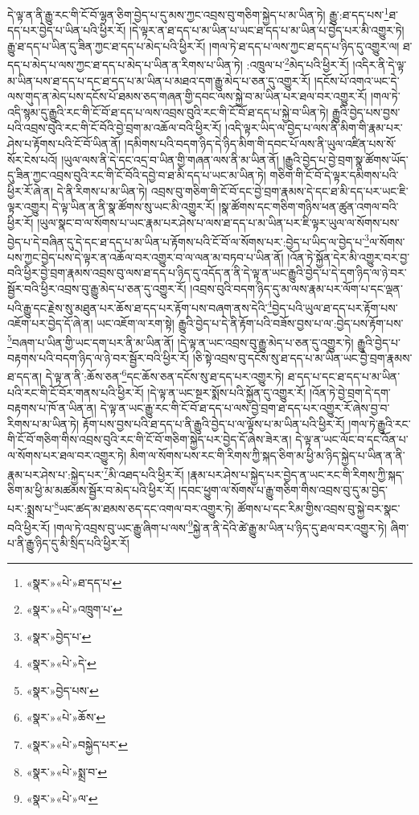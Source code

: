 དེ་ལྟ་ན་ནི་རྒྱུ་རང་གི་ངོ་བོ་ལྷན་ཅིག་བྱེད་པ་དུ་མས་ཀྱང་འབྲས་བུ་གཅིག་སྐྱེད་པ་མ་ཡིན་ཏེ། རྒྱུ་:ཐ་དད་པས་\footnote{«སྣར་»«པེ་»ཐ་དད་པ་}ཐ་དད་པར་བྱེད་པ་ཡིན་པའི་ཕྱིར་རོ། །དེ་ལྟར་ན་ཐ་དད་པ་མ་ཡིན་པ་ཡང་ཐ་དད་པ་མ་ཡིན་པ་བྱེད་པར་མི་འགྱུར་ཏེ། རྒྱུ་ཐ་དད་པ་ཡིན་དུ་ཟིན་ཀྱང་ཐ་དད་པ་མེད་པའི་ཕྱིར་རོ། །གལ་ཏེ་ཐ་དད་པ་ལས་ཀྱང་ཐ་དད་པ་ཉིད་དུ་འགྱུར་ལ། ཐ་དད་པ་མེད་པ་ལས་ཀྱང་ཐ་དད་པ་མེད་པ་ཡིན་ན་རིགས་པ་ཡིན་ཏེ། :འཁྲུལ་པ་\footnote{«སྣར་»«པེ་»འཁྲུག་པ་}མེད་པའི་ཕྱིར་རོ། །འདིར་ནི་དེ་ལྟ་མ་ཡིན་པས་ཐ་དད་པ་དང་ཐ་དད་པ་མ་ཡིན་པ་མཐའ་དག་རྒྱུ་མེད་པ་ཅན་དུ་འགྱུར་རོ། །དངོས་པོ་འགའ་ཡང་དེ་ལས་གུད་ན་མེད་པས་དངོས་པོ་ཐམས་ཅད་གཞན་གྱི་དབང་ལས་སྐྱེ་བ་མ་ཡིན་པར་ཐལ་བར་འགྱུར་རོ། །གལ་ཏེ་འདི་སྙམ་དུ་རྒྱུའི་རང་གི་ངོ་བོ་ཐ་དད་པ་ལས་འབྲས་བུའི་རང་གི་ངོ་བོ་ཐ་དད་པ་སྐྱེ་བ་ཡིན་ཏེ། རྒྱུའི་བྱེད་པས་བྱས་པའི་འབྲས་བུའི་རང་གི་ངོ་བོའི་བྱེ་བྲག་མ་འཆོལ་བའི་ཕྱིར་རོ། །འདི་ལྟར་ཡིད་ལ་བྱེད་པ་ལས་ནི་མིག་གི་རྣམ་པར་ཤེས་པ་རྟོགས་པའི་ངོ་བོ་ཡིན་ནོ། །དམིགས་པའི་བདག་ཉིད་དེ་ཉིད་མིག་གི་དབང་པོ་ལས་ནི་ཡུལ་འཛིན་པས་སོ་སོར་ངེས་པའོ། །ཡུལ་ལས་ནི་དེ་དང་འདྲ་བ་ཡིན་གྱི་གཞན་ལས་ནི་མ་ཡིན་ནོ། །རྒྱུའི་བྱེད་པ་བྱེ་བྲག་སྣ་ཚོགས་ཡོད་དུ་ཟིན་ཀྱང་འབྲས་བུའི་རང་གི་ངོ་བོའི་དབྱེ་བ་ཐ་མི་དད་པ་ཡང་མ་ཡིན་ཏེ། གཅིག་གི་ངོ་བོ་དེ་ལྟར་དམིགས་པའི་ཕྱིར་རོ་ཞེ་ན། དེ་ནི་རིགས་པ་མ་ཡིན་ཏེ། འབྲས་བུ་གཅིག་གི་ངོ་བོ་དང་བྱེ་བྲག་རྣམས་དེ་དང་ཐ་མི་དད་པར་ཡང་ཇི་ལྟར་འགྱུར། དེ་ལྟ་ཡིན་ན་ནི་སྣ་ཚོགས་སུ་ཡང་མི་འགྱུར་རོ། །སྣ་ཚོགས་དང་གཅིག་གཉིས་ཕན་ཚུན་འགལ་བའི་ཕྱིར་རོ། །ཡུལ་སྣང་བ་ལ་སོགས་པ་ཡང་རྣམ་པར་ཤེས་པ་ལས་ཐ་དད་པ་མ་ཡིན་པར་ཇི་ལྟར་ཡུལ་ལ་སོགས་པས་བྱེད་པ་དེ་བཞིན་དུ་དེ་དང་ཐ་དད་པ་མ་ཡིན་པ་རྟོགས་པའི་ངོ་བོ་ལ་སོགས་པར་:བྱེད་པ་ཡིད་ལ་བྱེད་པ་\footnote{«སྣར་»བྱེད་པ་}ལ་སོགས་པས་ཀྱང་བྱེད་པས་དེ་ལྟར་ན་འཆོལ་བར་འགྱུར་བ་ལ་ལན་མ་བཏབ་པ་ཡིན་ནོ། །འོན་ཏེ་སྐྱོན་དེར་མི་འགྱུར་བར་བྱ་བའི་ཕྱིར་བྱེ་བྲག་རྣམས་འབྲས་བུ་ལས་ཐ་དད་པ་ཉིད་དུ་འདོད་ན་ནི་དེ་ལྟ་ན་ཡང་རྒྱུའི་བྱེད་པ་དེ་དག་ཉིད་ལ་ཉེ་བར་སྦྱོར་བའི་ཕྱིར་འབྲས་བུ་རྒྱུ་མེད་པ་ཅན་དུ་འགྱུར་རོ། །འབྲས་བུའི་བདག་ཉིད་དུ་མ་ལས་རྣམ་པར་ལོག་པ་དང་ལྡན་པའི་རྒྱུ་དང་རྗེས་སུ་མཐུན་པར་ཆོས་ཐ་དད་པར་རྟོག་པས་བཞག་ནས་དེའི་\footnote{«སྣར་»«པེ་»དེ་}བྱེད་པའི་ཡུལ་ཐ་དད་པར་རྟོག་པས་འཇོག་པར་བྱེད་དོ་ཞེ་ན། ཡང་འཇོག་ལ་རག་སྟེ། རྒྱུའི་བྱེད་པ་དེ་ནི་རྟོག་པའི་བཟོས་བྱས་པ་ལ་:བྱེད་པས་རྟོག་པས་\footnote{«སྣར་»བྱེད་པས་}བཞག་པ་ཡིན་གྱི་ཡང་དག་པར་ནི་མ་ཡིན་ནོ། །དེ་ལྟ་ན་ཡང་འབྲས་བུ་རྒྱུ་མེད་པ་ཅན་དུ་འགྱུར་ཏེ། རྒྱུའི་བྱེད་པ་བརྟགས་པའི་བདག་ཉིད་ལ་ཉེ་བར་སྦྱོར་བའི་ཕྱིར་རོ། །ཅི་སྟེ་འབྲས་བུ་དངོས་སུ་ཐ་དད་པ་མ་ཡིན་ཡང་བྱེ་བྲག་རྣམས་ཐ་དད་ན། དེ་ལྟ་ན་ནི་:ཆོས་ཅན་\footnote{«སྣར་»«པེ་»ཆོས་}དང་ཆོས་ཅན་དངོས་སུ་ཐ་དད་པར་འགྱུར་ཏེ། ཐ་དད་པ་དང་ཐ་དད་པ་མ་ཡིན་པའི་རང་གི་ངོ་བོར་གནས་པའི་ཕྱིར་རོ། །དེ་ལྟ་ན་ཡང་སྔར་སྨོས་པའི་སྐྱོན་དུ་འགྱུར་རོ། །འོན་ཏེ་བྱེ་བྲག་དེ་དག་བརྟགས་པ་ཁོ་ན་ཡིན་ན། དེ་ལྟ་ན་ཡང་རྒྱུ་རང་གི་ངོ་བོ་ཐ་དད་པ་ལས་བྱེ་བྲག་ཐ་དད་པར་འགྱུར་རོ་ཞེས་བྱ་བ་རིགས་པ་མ་ཡིན་ཏེ། རྟོག་པས་བྱས་པའི་ཐ་དད་པ་ནི་རྒྱུའི་བྱེད་པ་ལ་ལྟོས་པ་མ་ཡིན་པའི་ཕྱིར་རོ། །གལ་ཏེ་རྒྱུའི་རང་གི་ངོ་བོ་གཅིག་གིས་འབྲས་བུའི་རང་གི་ངོ་བོ་གཅིག་སྐྱེད་པར་བྱེད་དོ་ཞེས་ཟེར་ན། དེ་ལྟ་ན་ཡང་ལོང་བ་དང་འོན་པ་ལ་སོགས་པར་ཐལ་བར་འགྱུར་ཏེ། མིག་ལ་སོགས་པས་རང་གི་རིགས་ཀྱི་སྐད་ཅིག་མ་ཕྱི་མ་ཉིད་སྐྱེད་པ་ཡིན་ན་ནི་རྣམ་པར་ཤེས་པ་:སྐྱེད་པར་\footnote{«སྣར་»«པེ་»བསྐྱེད་པར་}མི་འཐད་པའི་ཕྱིར་རོ། །རྣམ་པར་ཤེས་པ་སྐྱེད་པར་བྱེད་ན་ཡང་རང་གི་རིགས་ཀྱི་སྐད་ཅིག་མ་ཕྱི་མ་མཚམས་སྦྱོར་བ་མེད་པའི་ཕྱིར་རོ། །དབང་ཕྱུག་ལ་སོགས་པ་རྒྱུ་གཅིག་གིས་འབྲས་བུ་དུ་མ་བྱེད་པར་:སྨྲས་པ་\footnote{«སྣར་»«པེ་»སྨྲ་བ་}ཡང་ཚད་མ་ཐམས་ཅད་དང་འགལ་བར་འགྱུར་ཏེ། ཚོགས་པ་དང་རིམ་གྱིས་འབྲས་བུ་སྐྱེ་བར་སྣང་བའི་ཕྱིར་རོ། །གལ་ཏེ་འབྲས་བུ་ཡང་རྒྱུ་ཞིག་པ་ལས་\footnote{«སྣར་»«པེ་»ལ་}སྐྱེ་ན་ནི་དེའི་ཚེ་རྒྱུ་མ་ཡིན་པ་ཉིད་དུ་ཐལ་བར་འགྱུར་ཏེ། ཞིག་པ་ནི་རྒྱུ་ཉིད་དུ་མི་སྲིད་པའི་ཕྱིར་རོ། 